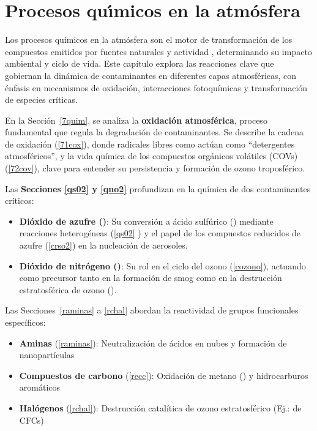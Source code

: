 %
\chapter[Procesos Quimicos en la Atmosfera]{Procesos qu\'{\i}micos en la atm\'osfera}

Los procesos químicos en la atmósfera son el motor de transformación de los compuestos emitidos por fuentes naturales y actividad , determinando su impacto ambiental y ciclo de vida. Este capítulo explora las reacciones clave que gobiernan la dinámica de contaminantes en diferentes capas atmosféricas, con énfasis en mecanismos de oxidación, interacciones fotoquímicas y transformación de especies críticas.

En la Sección~\ref{7quim}, se analiza la \textbf{oxidación atmosférica}, proceso fundamental que regula la degradación de contaminantes. Se describe la cadena de oxidación (\ref{71cox}), donde radicales libres como  actúan como ``detergentes atmosféricos'', y la vida química de los compuestos orgánicos volátiles (COVs) (\ref{72cov}), clave para entender su persistencia y formación de ozono troposférico.

Las \textbf{Secciones \ref{qs02} y \ref{qno2}} profundizan en la química de dos contaminantes críticos:
\begin{itemize}
    \item \textbf{Dióxido de azufre ()}: Su conversión a ácido sulfúrico () mediante reacciones heterogéneas (\ref{qs02} ) y el papel de los compuestos reducidos de azufre (\ref{crso2}) en la nucleación de aerosoles.
    \item \textbf{Dióxido de nitrógeno ()}: Su rol en el ciclo del ozono (\ref{cozono}), actuando como precursor tanto en la formación de smog como en la destrucción estratosférica de ozono ().
\end{itemize}

Las Secciones~\ref{raminas} a  \ref{rchal} abordan la reactividad de grupos funcionales específicos:
\begin{itemize}
    \item \textbf{Aminas} (\ref{raminas}): Neutralización de ácidos en nubes y formación de nanopartículas
    \item \textbf{Compuestos de carbono} (\ref{recc}): Oxidación de metano () y hidrocarburos aromáticos
    \item \textbf{Halógenos} (\ref{rchal}): Destrucción catalítica de ozono estratosférico (Ej.:  de CFCs)
\end{itemize}

